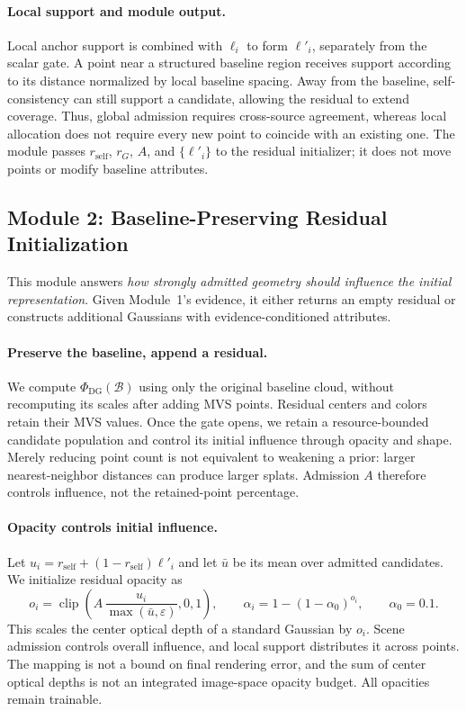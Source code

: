 \documentclass{article}
\newcommand{\rself}{r_{\mathrm{self}}}
\newcommand{\PhiDG}{\Phi_{\mathrm{DG}}}
\DeclareMathOperator{\clip}{clip}
\begin{document}
\paragraph{Local support and module output.}
Local anchor support is combined with $\ell_i$ to form $\ell'_i$, separately from the scalar gate. A point near a structured baseline region receives support according to its distance normalized by local baseline spacing. Away from the baseline, self-consistency can still support a candidate, allowing the residual to extend coverage. Thus, global admission requires cross-source agreement, whereas local allocation does not require every new point to coincide with an existing one. The module passes $\rself$, $r_G$, $A$, and $\{\ell'_i\}$ to the residual initializer; it does not move points or modify baseline attributes.

\subsection{Module 2: Baseline-Preserving Residual Initialization}
\label{sec:instantiation}

This module answers \emph{how strongly admitted geometry should influence the initial representation}. Given Module~1's evidence, it either returns an empty residual or constructs additional Gaussians with evidence-conditioned attributes.

\paragraph{Preserve the baseline, append a residual.}
We compute $\PhiDG(\mathcal B)$ using only the original baseline cloud, without recomputing its scales after adding MVS points. Residual centers and colors retain their MVS values. Once the gate opens, we retain a resource-bounded candidate population and control its initial influence through opacity and shape. Merely reducing point count is not equivalent to weakening a prior: larger nearest-neighbor distances can produce larger splats. Admission $A$ therefore controls influence, not the retained-point percentage.

\paragraph{Opacity controls initial influence.}
Let $u_i=\rself+(1-\rself)\ell'_i$ and let $\bar u$ be its mean over admitted candidates. We initialize residual opacity as
\begin{equation}
o_i=\clip\!\left(A\,\frac{u_i}{\max(\bar u,\varepsilon)},0,1\right),
\qquad
\alpha_i=1-(1-\alpha_0)^{o_i},
\qquad \alpha_0=0.1.
\label{eq:opacity}
\end{equation}
This scales the center optical depth of a standard Gaussian by $o_i$. Scene admission controls overall influence, and local support distributes it across points. The mapping is not a bound on final rendering error, and the sum of center optical depths is not an integrated image-space opacity budget. All opacities remain trainable.
\end{document}
